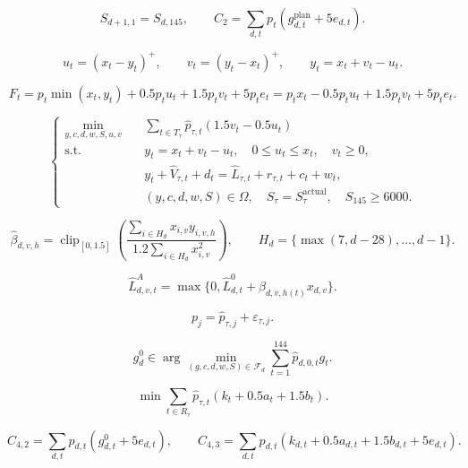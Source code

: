 \[
S_{d+1,1}=S_{d,145},\qquad C_2=\sum_{d,t}p_t\left(g_{d,t}^{\mathrm{plan}}+5e_{d,t}\right).
\]

\[
u_t=(x_t-y_t)^+,\qquad v_t=(y_t-x_t)^+,\qquad y_t=x_t+v_t-u_t.
\]

\[
F_t=p_t\min(x_t,y_t)+0.5p_tu_t+1.5p_tv_t+5p_te_t=p_tx_t-0.5p_tu_t+1.5p_tv_t+5p_te_t.
\]

\[
\boxed{\left\{\begin{aligned}\min_{y,c,d,w,S,u,v}\quad&\sum_{t\in T_\tau}\hat p_{\tau,t}(1.5v_t-0.5u_t)\\\mathrm{s.t.}\quad&y_t=x_t+v_t-u_t,\quad0\le u_t\le x_t,\quad v_t\ge0,\\&y_t+\hat V_{\tau,t}+d_t=\hat L_{\tau,t}+r_{\tau,t}+c_t+w_t,\\&(y,c,d,w,S)\in\Omega,\quad S_\tau=S_\tau^{\mathrm{actual}},\quad S_{145}\ge6000.\end{aligned}\right.}
\]

\[
\hat\beta_{d,v,h}=\operatorname{clip}_{[0,1.5]}\left(\frac{\sum_{i\in H_d}x_{i,v}y_{i,v,h}}{1.2\sum_{i\in H_d}x_{i,v}^{2}}\right),\qquad H_d=\{\max(7,d-28),\ldots,d-1\}.
\]

\[
\hat L^{A}_{d,v,t}=\max\{0,\hat L^{0}_{d,t}+\hat\beta_{d,v,h(t)}x_{d,v}\}.
\]

\[
p_j=\hat p_{\tau,j}+\varepsilon_{\tau,j}.
\]

\[
g_d^{0}\in\arg\min_{(g,c,d,w,S)\in\mathcal F_d}\sum_{t=1}^{144}\hat p_{d,0,t}g_t.
\]

\[
\min\sum_{t\in R_\tau}\hat p_{\tau,t}\left(k_t+0.5a_t+1.5b_t\right).
\]

\[
C_{4,2}=\sum_{d,t}p_{d,t}\left(g^0_{d,t}+5e_{d,t}\right),\qquad C_{4,3}=\sum_{d,t}p_{d,t}\left(k_{d,t}+0.5a_{d,t}+1.5b_{d,t}+5e_{d,t}\right).
\]